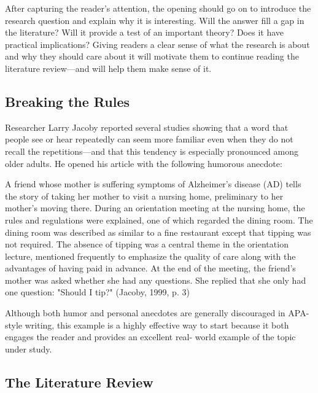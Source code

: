 After capturing the reader's attention, the opening should go on to introduce the research question and explain why it is interesting. Will the answer fill a gap in the literature? Will it provide a test of an important theory? Does it have practical implications? Giving readers a clear sense of what the research is about and why they should care about it will motivate them to continue reading the literature review---and will help them make sense of it.


\subsection{Breaking the Rules}



Researcher Larry Jacoby reported several studies showing that a word that people see or hear repeatedly can seem more familiar even when they do not recall the repetitions---and that this tendency is especially pronounced among older adults. He opened his article with the following humorous anecdote:




A friend whose mother is suffering symptoms of Alzheimer's disease (AD) tells the story of taking her mother to visit a nursing home, preliminary to her mother's moving there. During an orientation meeting at the nursing home, the rules and regulations were explained, one of which regarded the dining room. The dining room was described as similar to a fine restaurant except that tipping was not required. The absence of tipping was a central theme in the orientation lecture, mentioned frequently to emphasize the quality of care along with the advantages of having paid in advance. At the end of the meeting, the friend's mother was asked whether she had any questions. She replied that she only had one question: "Should I tip?" (Jacoby, 1999, p. 3)




Although both humor and personal anecdotes are generally discouraged in APA-style writing, this example is a highly effective way to start because it both engages the reader and provides an excellent real- world example of the topic under study.




\subsection{The Literature Review}



